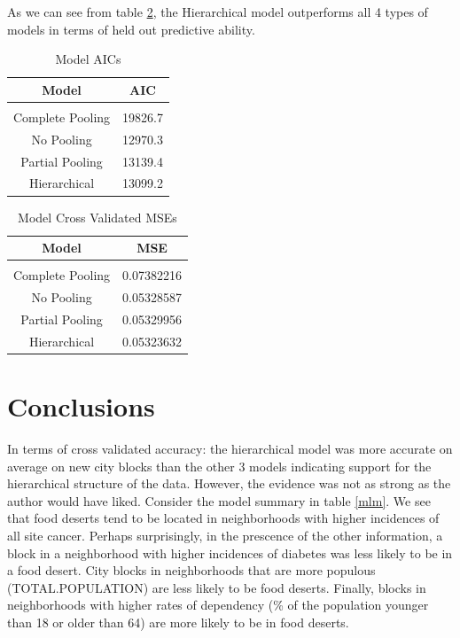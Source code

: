 \documentclass{report}
\begin{document}
As we can see from table \ref{MSEs}, the Hierarchical model outperforms all 4 types of models in terms of held out predictive ability. 

\begin{table}[!htbp] \centering
  \caption{Model AICs}
  \label{AICs}
  \begin{tabular}[c]{c|c}
\\    Model & AIC \\
    \hline \\
    Complete Pooling & 19826.7 \\
    No Pooling & 12970.3 \\
    Partial Pooling & 13139.4 \\
    Hierarchical & 13099.2 \\
  \end{tabular}
\end{table}

\begin{table}[!htbp] \centering
  \caption{Model Cross Validated MSEs}
  \label{MSEs}
  \begin{tabular}[c]{c|c}
\\    Model & MSE \\
    \hline \\
    Complete Pooling & 0.07382216 \\
    No Pooling &  0.05328587 \\
    Partial Pooling & 0.05329956 \\
    Hierarchical & 0.05323632 \\
  \end{tabular}
\end{table}

\section*{Conclusions}

In terms of cross validated accuracy: the hierarchical model was more accurate on average on new city blocks than the other 3 models indicating support for the hierarchical structure of the data. However, the evidence was not as strong as the author would have liked. Consider the model summary in table \ref{mlm}. We see that food deserts tend to be located in neighborhoods with higher incidences of all site cancer. Perhaps surprisingly, in the prescence of the other information, a block in a neighborhood with higher incidences of diabetes was less likely to be in a food desert. City blocks in neighborhoods that are more populous (TOTAL.POPULATION) are less likely to be food deserts. Finally, blocks in neighborhoods with higher rates of dependency (\% of the population younger than 18 or older than 64) are more likely to be in food deserts.
\end{document}
